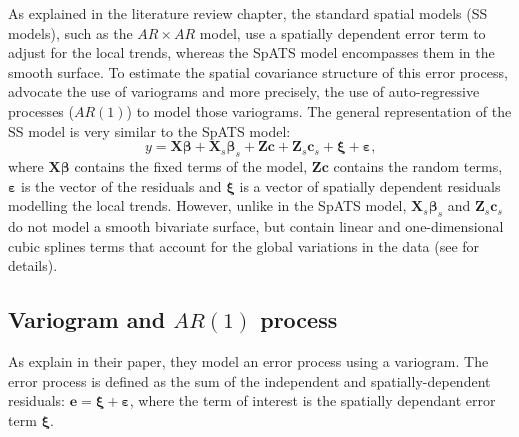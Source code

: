 As explained in the literature review chapter, the standard spatial models (SS models), such as the $AR \times AR$ model, use a spatially dependent error term to adjust for the local trends, whereas the SpATS model encompasses them in the smooth surface. 
To estimate the spatial covariance structure of this error process, \textcite{gilmour_accounting_1997} advocate the use of variograms and more precisely, the use of auto-regressive processes ($AR(1)$) to model those variograms. 
The general representation of the SS model is very similar to the SpATS model:
\begin{equation}
	y = \mathbf{X}\boldsymbol{\beta} + \mathbf{X}_{s}\boldsymbol{\beta}_{s} + \mathbf{Zc} +  \mathbf{Z}_{s}\mathbf{c}_{s} + 
	\boldsymbol{\xi} + \boldsymbol{\varepsilon}
	\text{,}
	\label{eq:standard_spatial_model}
\end{equation}
where $\mathbf{X}\boldsymbol{\beta}$ contains the fixed terms of the model, $\mathbf{Zc}$ contains the random terms, $\boldsymbol{\varepsilon}$ is the vector of the residuals and $\boldsymbol{\xi}$ is a vector of spatially dependent residuals modelling the local trends. However, unlike in the SpATS model, $\mathbf{X}_{s}\boldsymbol{\beta}_{s}$ and $\mathbf{Z}_{s}\mathbf{c}_{s}$ do not model a smooth bivariate surface, but contain linear and one-dimensional cubic splines terms that account for the global variations in the data (see \textcite{verbyla_analysis_1999} for details).\\

\subsection{Variogram and $AR(1)$ process}
As \textcite{gilmour_accounting_1997} explain in their paper, they model an error process using a variogram. The error process is defined as the sum of the independent and spatially-dependent residuals: $\mathbf{e} = \boldsymbol{\xi} + \boldsymbol{\varepsilon}$, where the term of interest is the spatially dependant error term $\boldsymbol{\xi}$.\\

